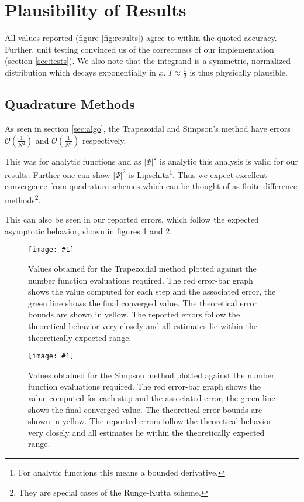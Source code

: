 \documentclass[10pt, a4paper]{article}
\newcommand{\plot}[3]{\begin{figure}[htp]\centering\texttt{[image: \#1]}\caption{#2}\label{#3}\end{figure}}
\begin{document}
\section{Plausibility of Results}
\label{sec:verify}


  All values reported (figure \ref{fig:results}) agree to within the quoted accuracy. Further, unit
  testing convinced us of the correctness of our implementation (section \ref{sec:tests}). We also note
  that the integrand is a symmetric, normalized distribution which decays exponentially in $x$.
  $I \approx \frac12$ is thus physically plausible.

  \subsection{Quadrature Methods}
  As seen in section \ref{sec:algo}, the Trapezoidal and Simpson's method have errors
  $\mathcal{O}\left( \frac{1}{N^2} \right)$ and $\mathcal{O}\left( \frac{1}{N^4} \right)$ respectively.

  This was for analytic functions and as $|\Psi|^2$ is analytic this analysis is valid
  for our results. Further one can show $|\Psi|^2$ is Lipschitz\footnote{For analytic functions this means
  a bounded derivative.}. Thus we expect excellent convergence
  from quadrature schemes which can be thought of as finite difference methods\footnote{They are special
  cases of the Runge-Kutta scheme\cite{nr}.}.

  This can also be seen in our reported errors, which follow the expected asymptotic behavior, shown in
  figures \ref{fig:trap} and \ref{fig:simp}.

  \plot{proj-trap-accuracy}{
    Values obtained for the Trapezoidal method plotted against the number function evaluations required. The red
    error-bar graph shows the value computed for each step and the associated error, the green line
    shows the final converged value. The theoretical error bounds are shown in yellow. The reported errors
    follow the theoretical behavior very closely and all estimates lie within the theoretically expected range.
  }{fig:trap}

  \plot{proj-simp-accuracy}{
    Values obtained for the Simpson method plotted against the number function evaluations required. The red
    error-bar graph shows the value computed for each step and the associated error, the green line
    shows the final converged value. The theoretical error bounds are shown in yellow. The reported errors
    follow the theoretical behavior very closely and all estimates lie within the theoretically expected range.
  }{fig:simp}
\end{document}
